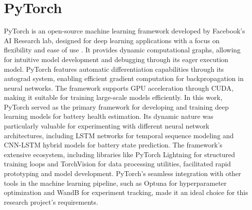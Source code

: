 \section{PyTorch}
PyTorch is an open-source machine learning framework developed by Facebook's AI Research lab, designed for deep learning applications with a focus on flexibility and ease of use \cite{ansel_pytorch_2024}. It provides dynamic computational graphs, allowing for intuitive model development and debugging through its eager execution model. PyTorch features automatic differentiation capabilities through its autograd system, enabling efficient gradient computation for backpropagation in neural networks. The framework supports GPU acceleration through CUDA, making it suitable for training large-scale models efficiently. In this work, PyTorch served as the primary framework for developing and training deep learning models for battery health estimation. Its dynamic nature was particularly valuable for experimenting with different neural network architectures, including LSTM networks for temporal sequence modeling and CNN-LSTM hybrid models for battery state prediction. The framework's extensive ecosystem, including libraries like PyTorch Lightning for structured training loops and TorchVision for data processing utilities, facilitated rapid prototyping and model development. PyTorch's seamless integration with other tools in the machine learning pipeline, such as Optuna for hyperparameter optimization and WandB for experiment tracking, made it an ideal choice for this research project's requirements.


